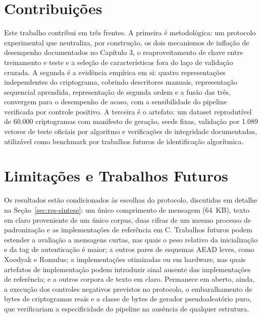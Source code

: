 \section{Contribuições}

Este trabalho contribui em três frentes. A primeira é metodológica: um protocolo experimental que neutraliza, por construção, os dois mecanismos de inflação de desempenho documentados no Capítulo 3, o reaproveitamento de chave entre treinamento e teste e a seleção de características fora do laço de validação cruzada. A segunda é a evidência empírica em si: quatro representações independentes do criptograma, cobrindo descritores manuais, representação sequencial aprendida, representação de segunda ordem e a fusão das três, convergem para o desempenho de acaso, com a sensibilidade do pipeline verificada por controle positivo. A terceira é o artefato: um dataset reprodutível de 60.000 criptogramas com manifesto de geração, seeds fixas, validação por 1.089 vetores de teste oficiais por algoritmo e verificações de integridade documentadas, utilizável como benchmark por trabalhos futuros de identificação algorítmica.

\section{Limitações e Trabalhos Futuros}

Os resultados estão condicionados às escolhas do protocolo, discutidas em detalhe na Seção~\ref{sec:res-sintese}: um único comprimento de mensagem (64~KB), texto em claro proveniente de um único corpus, duas cifras de um mesmo processo de padronização e as implementações de referência em C. Trabalhos futuros podem estender a avaliação a mensagens curtas, nas quais o peso relativo da inicialização e da tag de autenticação é maior; a outros pares de esquemas AEAD leves, como Xoodyak e Romulus; a implementações otimizadas ou em hardware, nas quais artefatos de implementação podem introduzir sinal ausente das implementações de referência; e a outros corpora de texto em claro. Permanece em aberto, ainda, a execução dos controles negativos previstos no protocolo, o embaralhamento de bytes de criptogramas reais e a classe de bytes de gerador pseudoaleatório puro, que verificariam a especificidade do pipeline na ausência de qualquer estrutura.
